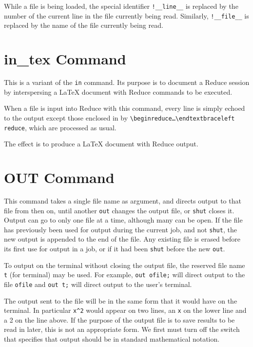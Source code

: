 While a file is being loaded, the special identifier
\texttt{!\_\_line\_\_}
is replaced by the number of the current line in the file currently
being read.
Similarly, \texttt{!\_\_file\_\_}
is replaced by the name of the file currently
being read.

\section{in\_tex Command}
\hypertarget{command:IN_TEX}{}

This is a variant of the \texttt{in} command. Its purpose is to document a Reduce session
by interspersing a \LaTeX{} document with Reduce commands to be executed.

When a file is input into Reduce with this command, every line is simply echoed to the output
except those enclosed in by
\texttt{\textbackslash begin\textbraceleft reduce\textbraceright\ldots\textbackslash endtextbraceleft reduce\textbraceright},
which are processed as usual.

The effect is to produce a \LaTeX{} document with Reduce output.


\section{OUT Command}
\hypertarget{command:OUT}{}
This command takes a single file name as argument, and directs output to
that file from then on, until another \texttt{out} changes the output file,
or \texttt{shut} closes it.  Output can go to only one file at a time,
although many can be open.  If the file has previously been used for
output during the current job, and not \texttt{shut}, the new
output is appended to the end of the file.  Any existing file is erased
before its first use for output in a job, or if it had been \texttt{shut}
before the new \texttt{out}.

To output on the terminal without closing the output file, the reserved
file name \texttt{t} (for terminal) may be used.  For example,
\texttt{out ofile;} will direct output to the file \texttt{ofile} and
\texttt{out t;} will direct output to the user's terminal.

The output sent to the file will be in the same form that it would have on
the terminal.  In particular \texttt{x\textasciicircum 2} would appear
on two lines, an
\texttt{x} on the lower line and a 2 on the line above.  If the purpose of the
output file is to save results to be read in later, this is not an
appropriate form.  We first must turn off the  switch that
specifies that output should be in standard mathematical notation.

